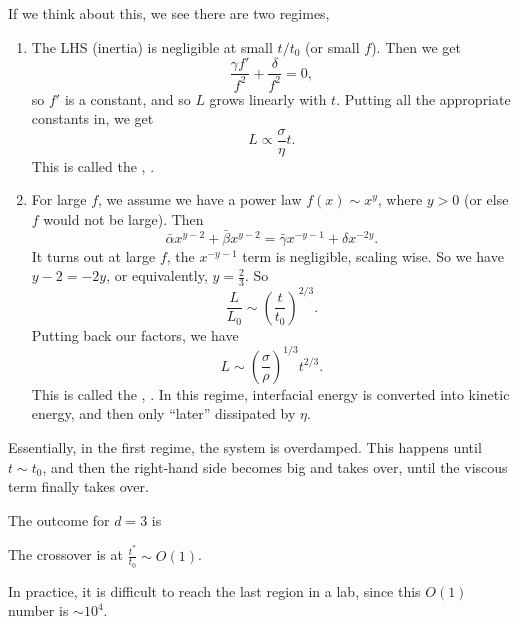 \documentclass[a4paper]{article}
\begin{document}
If we think about this, we see there are two regimes,
\begin{enumerate}
  \item The LHS (inertia) is negligible at small $t/t_0$ (or small $f$). Then we get
    \[
      \frac{\gamma f'}{f^2} + \frac{\delta}{f^2} = 0,
    \]
    so $f'$ is a constant, and so $L$ grows linearly with $t$. Putting all the appropriate constants in, we get
    \[
      L \propto \frac{\sigma}{\eta} t.
    \]
    This is called the , .

  \item For large $f$, we assume we have a power law $f(x) \sim x^y$, where $y > 0$ (or else $f$ would not be large). Then
    \[
      \bar{\alpha} x^{y - 2} + \bar{\beta} x^{y - 2} = \bar{\gamma} x^{-y - 1} + \delta x^{-2y}.
    \]
    It turns out at large $f$, the $x^{-y - 1}$ term is negligible, scaling wise. So we have $y - 2 = -2y$, or equivalently, $y = \frac{2}{3}$. So
    \[
      \frac{L}{L_0} \sim \left(\frac{t}{t_0}\right)^{2/3}.
    \]
    Putting back our factors, we have
    \[
      L \sim \left(\frac{\sigma}{\rho}\right)^{1/3} t^{2/3}.
    \]
    This is called the , . In this regime, interfacial energy is converted into kinetic energy, and then only ``later'' dissipated by $\eta$.
\end{enumerate}
Essentially, in the first regime, the system is overdamped. This happens until $t \sim t_0$, and then the right-hand side becomes big and takes over, until the viscous term finally takes over.

The outcome for $d = 3$ is
\begin{center}
\end{center}
The crossover is at $\frac{t^*}{t_0} \sim O(1)$.

In practice, it is difficult to reach the last region in a lab, since this $O(1)$ number is $\sim 10^4$.
\end{document}
